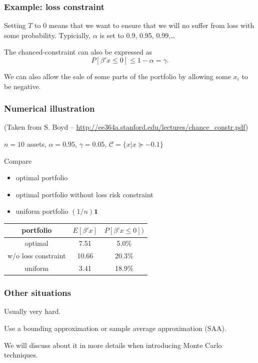 \documentclass{beamer}
\begin{document}
\begin{frame}
\frametitle{Example: loss constraint}

Setting $T$ to 0 means that we want to ensure that we will no suffer from loss with some probability. Typicially, $\alpha$ is set to 0.9, 0.95, 0.99,\ldots

\mbox{}

The chanced-constraint can also be expressed as
\[
P\left[ \beta' x \leq 0 \right] \leq 1-\alpha = \gamma.
\]

\mbox{}

We can also allow the sale of some parts of the portfolio by allowing some $x_i$ to be negative.
\end{frame}

\begin{frame}
\frametitle{Numerical illustration}

(Taken from S. Boyd -- \url{http://ee364a.stanford.edu/lectures/chance_constr.pdf})

$n = 10$ assets, $\alpha = 0.95$, $\gamma = 0.05$, $\mathcal{C} = \{x | x \succeq -0.1\}$

\mbox{}

Compare
\begin{itemize}
\item
optimal portfolio
\item
optimal portfolio without loss risk constraint
\item
uniform portfolio $(1/n)\mathbf{1}$
\end{itemize}

\mbox{}

\begin{center}
\begin{tabular}{c|c|c}
portfolio & $E[\beta'x]$ & $P[\beta' x \leq 0])$ \\
\hline
optimal & 7.51 & 5.0\% \\
w/o loss constraint & 10.66 & 20.3\% \\
uniform & 3.41 & 18.9\%
\end{tabular}
\end{center}

\end{frame}

\begin{frame}
\frametitle{Other situations}

Usually very hard.

\mbox{}

Use a bounding approximation or sample average approximation (SAA).

\mbox{}

We will discuss about it in more details when introducing Monte Carlo techniques.

\end{frame}
\end{document}
